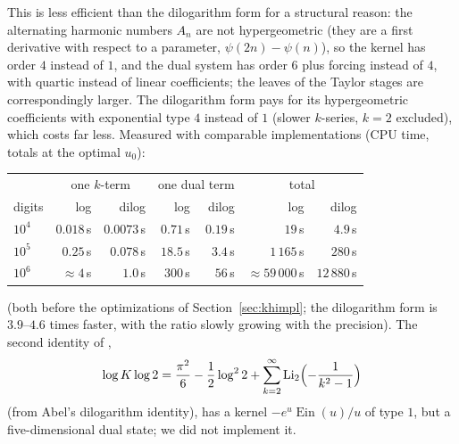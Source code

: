 \documentclass[11pt,reqno]{amsart}
\theoremstyle{definition}
\theoremstyle{remark}
\newcommand{\Ein}{\operatorname{Ein}}
\newcommand{\Li}{\operatorname{Li}}
\begin{document}
This is less efficient than the dilogarithm form for a structural reason: the alternating harmonic numbers
$A_n$ are not hypergeometric (they are a first derivative with respect to a parameter, $\psi(2n) - \psi(n)$),
so the kernel has order $4$ instead of $1$, and the dual system has order $6$ plus forcing instead of $4$, with
quartic instead of linear coefficients; the leaves of the Taylor stages are correspondingly larger. The
dilogarithm form pays for its hypergeometric coefficients with exponential type $4$ instead of $1$ (slower
$k$-series, $k = 2$ excluded), which costs far less. Measured with comparable implementations (CPU time, totals at the
optimal $u_0$):
\begin{center}
\begin{tabular}{lrrrrrr}
\toprule
 & \multicolumn{2}{c}{one $k$-term} & \multicolumn{2}{c}{one dual term} & \multicolumn{2}{c}{total} \\
digits & log & dilog & log & dilog & log & dilog \\
\midrule
$10^4$ & $0.018$\,s & $0.0073$\,s & $0.71$\,s & $0.19$\,s & $19$\,s & $4.9$\,s \\
$10^5$ & $0.25$\,s & $0.078$\,s & $18.5$\,s & $3.4$\,s & $1\,165$\,s & $280$\,s \\
$10^6$ & $\approx 4$\,s & $1.0$\,s & $300$\,s & $56$\,s & $\approx 59\,000$\,s & $12\,880$\,s \\
\bottomrule
\end{tabular}
\end{center}
(both before the optimizations of Section~\ref{sec:khimpl}; the dilogarithm form is $3.9$--$4.6$ times faster, with
the ratio slowly growing with the precision). The second identity of \cite[\S3]{BBC97},
\[
  \log K\log2 = \frac{\pi^2}{6} - \frac12\log^22 + \sum_{k=2}^{\infty}\Li_2\Bigl(-\frac1{k^2-1}\Bigr)
\]
(from Abel's dilogarithm identity), has a
kernel $-e^u\Ein(u)/u$ of type $1$, but a five-dimensional dual state; we did not implement it.
\end{document}
